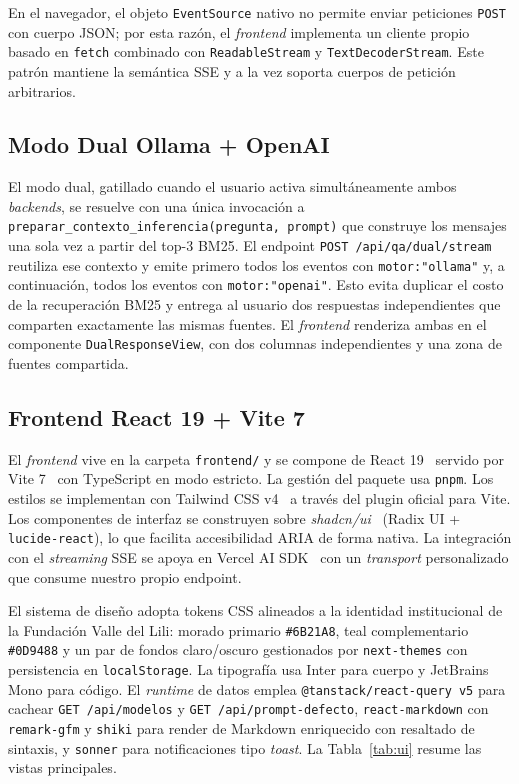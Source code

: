 \documentclass[conference]{IEEEtran}
\newcommand{\code}[1]{\texttt{\small #1}}
\begin{document}
En el navegador, el objeto \code{EventSource} nativo no permite enviar
peticiones \code{POST} con cuerpo JSON; por esta razón, el \textit{frontend}
implementa un cliente propio basado en \code{fetch} combinado con
\code{ReadableStream} y \code{TextDecoderStream}. Este patrón mantiene la
semántica SSE y a la vez soporta cuerpos de petición arbitrarios.

\subsection{Modo Dual Ollama + OpenAI}

El modo dual, gatillado cuando el usuario activa simultáneamente ambos
\textit{backends}, se resuelve con una única invocación a
\code{preparar\_contexto\_inferencia(pregunta, prompt)} que construye los
mensajes una sola vez a partir del top-3 BM25. El endpoint
\code{POST /api/qa/dual/stream} reutiliza ese contexto y emite primero
todos los eventos con \code{motor:"ollama"} y, a continuación, todos los
eventos con \code{motor:"openai"}. Esto evita duplicar el costo de la
recuperación BM25 y entrega al usuario dos respuestas independientes que
comparten exactamente las mismas fuentes. El \textit{frontend} renderiza
ambas en el componente \code{DualResponseView}, con dos columnas
independientes y una zona de fuentes compartida.

\subsection{Frontend React 19 + Vite 7}

El \textit{frontend} vive en la carpeta \code{frontend/} y se compone de
React 19~\cite{react19} servido por Vite 7~\cite{vite} con TypeScript en
modo estricto. La gestión del paquete usa \code{pnpm}. Los estilos se
implementan con Tailwind CSS v4~\cite{tailwindv4} a través del plugin
oficial para Vite. Los componentes de interfaz se construyen sobre
\textit{shadcn/ui}~\cite{shadcnui} (Radix UI + \code{lucide-react}), lo que
facilita accesibilidad ARIA de forma nativa. La integración con el
\textit{streaming} SSE se apoya en Vercel AI SDK~\cite{vercelaisdk} con un
\textit{transport} personalizado que consume nuestro propio endpoint.

El sistema de diseño adopta tokens CSS alineados a la identidad
institucional de la Fundación Valle del Lili: morado primario
\code{\#6B21A8}, teal complementario \code{\#0D9488} y un par de fondos
claro/oscuro gestionados por \code{next-themes} con persistencia en
\code{localStorage}. La tipografía usa Inter para cuerpo y JetBrains Mono
para código. El \textit{runtime} de datos emplea
\code{@tanstack/react-query v5} para cachear \code{GET /api/modelos} y
\code{GET /api/prompt-defecto}, \code{react-markdown} con
\code{remark-gfm} y \code{shiki} para render de Markdown enriquecido con
resaltado de sintaxis, y \code{sonner} para notificaciones tipo
\textit{toast}. La Tabla~\ref{tab:ui} resume las vistas principales.
\end{document}
